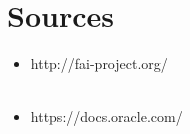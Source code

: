 \documentclass[a4paper,12pt,one side,titlepage]{report}
\begin{document}
\chapter{Sources}
\begin{itemize}
  \item http://fai-project.org/\\\\
  \item https://docs.oracle.com/
\end{itemize}
\end{document}
